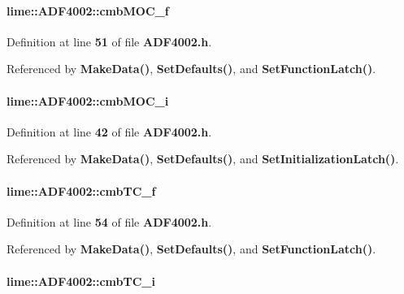 \paragraph[{cmb\+M\+O\+C\+\_\+f}]{ lime\+::\+A\+D\+F4002\+::cmb\+M\+O\+C\+\_\+f}\label{classlime_1_1ADF4002_a8ca8c02f760371fac5a0982c677b2d49}


Definition at line {\bf 51} of file {\bf A\+D\+F4002.\+h}.



Referenced by {\bf Make\+Data()}, {\bf Set\+Defaults()}, and {\bf Set\+Function\+Latch()}.

\paragraph[{cmb\+M\+O\+C\+\_\+i}]{ lime\+::\+A\+D\+F4002\+::cmb\+M\+O\+C\+\_\+i}\label{classlime_1_1ADF4002_a8594c1a27d212f32cab948677899a96b}


Definition at line {\bf 42} of file {\bf A\+D\+F4002.\+h}.



Referenced by {\bf Make\+Data()}, {\bf Set\+Defaults()}, and {\bf Set\+Initialization\+Latch()}.

\paragraph[{cmb\+T\+C\+\_\+f}]{ lime\+::\+A\+D\+F4002\+::cmb\+T\+C\+\_\+f}\label{classlime_1_1ADF4002_a68ee1fbc97576eec2c6ee80fae3ece3e}


Definition at line {\bf 54} of file {\bf A\+D\+F4002.\+h}.



Referenced by {\bf Make\+Data()}, {\bf Set\+Defaults()}, and {\bf Set\+Function\+Latch()}.

\paragraph[{cmb\+T\+C\+\_\+i}]{ lime\+::\+A\+D\+F4002\+::cmb\+T\+C\+\_\+i}\label{classlime_1_1ADF4002_ad01350b8f13420cfcb5268e6a1a91227}


